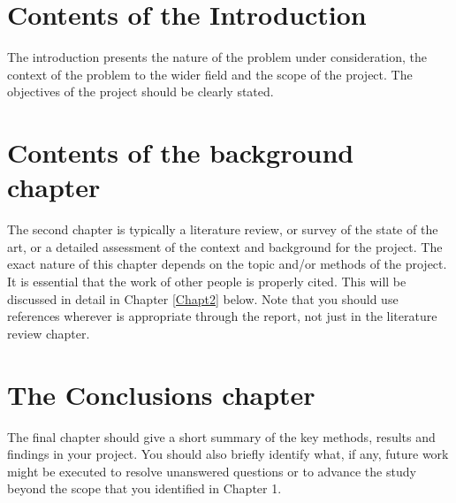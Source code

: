 \section{Contents of the Introduction} 
The introduction presents the nature of the problem under consideration, the context of the problem to the wider field and the scope of the project. The objectives of the project should be clearly stated.
\section{Contents of the background chapter}	
The second chapter is typically a literature review, or survey of the state of the art, or a detailed assessment of the context and background for the project. The exact nature of this chapter depends on the topic and/or methods of the project. It is essential that the work of other people is properly cited. This will be discussed in detail in Chapter \ref{Chapt2} below. Note that you should use references wherever is appropriate through the report, not just in the literature review chapter.
\section{The Conclusions chapter} 
The final chapter should give a short summary of the key methods, results and findings in your project. You should also briefly identify what, if any, future work might be executed to resolve unanswered questions or to advance the study beyond the scope that you identified in Chapter 1. 
